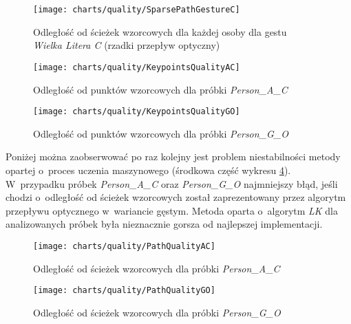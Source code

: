       \begin{figure}[!ht]
        \centering
        \texttt{[image: charts/quality/SparsePathGestureC]}
        \caption[Odległość od ścieżek wzorcowych dla każdej osoby dla gestu C (rzadki przepływ optyczny)]
                {Odległość od ścieżek wzorcowych dla każdej osoby dla gestu\\\textit{Wielka Litera C} (rzadki przepływ optyczny)}
        \label{fig:SparsePathGestureC}
      \end{figure}

    \newpage
      \begin{figure}[!ht]
        \centering
        \texttt{[image: charts/quality/KeypointsQualityAC]}
        \caption[Odległość od punktów wzorcowych (próbka osoby A, gest C)]
                {Odległość od punktów wzorcowych dla próbki \textit{Person\_A\_C}}
        \label{fig:KeypointsQualityAC}
      \end{figure}

      \begin{figure}[!ht]
        \centering
        \texttt{[image: charts/quality/KeypointsQualityGO]}
        \caption[Odległość od punktów wzorcowych (próbka osoby G, gest O)]
                {Odległość od punktów wzorcowych dla próbki \textit{Person\_G\_O}}
        \label{fig:KeypointsQualityGO}
      \end{figure}

    Poniżej można zaobserwować po raz kolejny jest problem niestabilności metody opartej o~proces uczenia maszynowego (środkowa część wykresu \ref{fig:PathQualityAC}). W~przypadku próbek \textit{Person\_A\_C} oraz \textit{Person\_G\_O} najmniejszy błąd, jeśli chodzi o~odległość od ścieżek wzorcowych został zaprezentowany przez algorytm przepływu optycznego w~wariancie gęstym. Metoda oparta o~algorytm \textit{LK} dla analizowanych próbek była nieznacznie gorsza od najlepszej implementacji.

    \newpage
      \begin{figure}[!ht]
        \centering
        \texttt{[image: charts/quality/PathQualityAC]}
        \caption[Odległość od ścieżek wzorcowych (próbka osoby A, gest C)]
                {Odległość od ścieżek wzorcowych dla próbki \textit{Person\_A\_C}}
        \label{fig:PathQualityAC}
      \end{figure}

      \begin{figure}[!ht]
        \centering
        \texttt{[image: charts/quality/PathQualityGO]}
        \caption[Odległość od ścieżek wzorcowych (próbka osoby G, gest O)]
                {Odległość od ścieżek wzorcowych dla próbki \textit{Person\_G\_O}}
        \label{fig:PathQualityGO}
      \end{figure}

